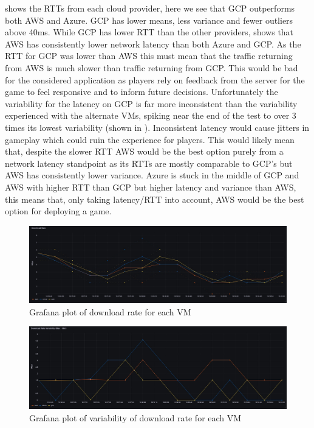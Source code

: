 \documentclass[11pt,a4paper]{article}
\begin{document}
 shows the RTTs from each cloud provider, here we see that GCP outperforms both AWS and Azure. GCP has lower means, less variance and fewer outliers above 40ms. While GCP has lower RTT than the other providers,  shows that AWS has consistently lower network latency than both Azure and GCP. As the RTT for GCP was lower than AWS this must mean that the traffic returning from AWS is much slower than traffic returning from GCP. This would be bad for the considered application as players rely on feedback from the server for the game to feel responsive and to inform future decisions. Unfortunately the variability for the latency on GCP is far more inconsistent than the variability experienced with the alternate VMs, spiking near the end of the test to over 3 times its lowest variability (shown in ). Inconsistent latency would cause jitters in gameplay which could ruin the experience for players. This would likely mean that, despite the slower RTT AWS would be the best option purely from a network latency standpoint as its RTTs are mostly comparable to GCP's but AWS has consistently lower variance. Azure is stuck in the middle of GCP and AWS with higher RTT than GCP but higher latency and variance than AWS, this means that, only taking latency/RTT into account, AWS would be the best option for deploying a game.

\begin{figure}
\label{download}
\includegraphics[width=\textwidth]{DownloadRate.jpeg}
\caption{Grafana plot of download rate for each VM}
\end{figure}

\begin{figure}
\label{download-var}
\includegraphics[width=\textwidth]{DownloadRateVar.jpeg}
\caption{Grafana plot of variability of download rate for each VM}
\end{figure}
\end{document}
